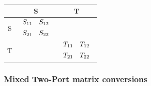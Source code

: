 \documentclass[10pt]{report}
\begin{document}
\begin{tabular}{|c|c|c|}
\hline
& S & T\\
\hline
S &
$\begin{array}{cc}S_{11}&S_{12}\vspace{4pt}\\S_{21}&S_{22}\end{array}$ &
\setlength{\fboxrule}{0pt}
\fbox{$\begin{array}{cc}\dfrac{T_{12}}{T_{22}}&\dfrac{\Delta T}{T_{22}}\vspace{4pt}\\\dfrac{1}{T_{22}}&\dfrac{-T_{21}}{T_{22}}\end{array}$}\\
\hline
T &
\setlength{\fboxrule}{0pt}
\fbox{$\begin{array}{cc}\dfrac{-\Delta S}{S_{21}}&\dfrac{S_{11}}{S_{21}}\vspace{4pt}\\\dfrac{-S_{22}}{S_{21}}&\dfrac{1}{S_{21}}\end{array}$} &
$\begin{array}{cc}T_{11}&T_{12}\vspace{4pt}\\T_{21}&T_{22}\end{array}$\\
\hline
\end{tabular}

\subsubsection{Mixed Two-Port matrix conversions}
\end{document}
